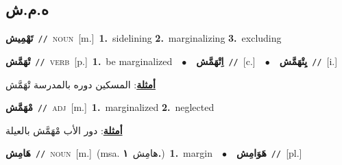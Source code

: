 \documentclass[10pt,a4paper,twoside]{article} %
\begin{document}
\begin{multicols}{2}
\vspace{-3mm}
\subsection*{\color{blue}\foreignlanguage{arabic}{ه.م.ش}\color{blue}{}} 

{\setlength\topsep{0pt}\textbf{\foreignlanguage{arabic}{تَهْمِيش}}\ {\color{gray}\texttt{//}\color{black}}\ \textsc{noun}\ [m.]\ \textbf{1.}~sidelining  \textbf{2.}~marginalizing  \textbf{3.}~excluding\ } \vspace{2mm}

{\setlength\topsep{0pt}\textbf{\foreignlanguage{arabic}{تْهَمَّش}}\ {\color{gray}\texttt{//}\color{black}}\ \textsc{verb}\ [p.]\ \textbf{1.}~be marginalized\ \ $\bullet$\ \ \setlength\topsep{0pt}\textbf{\foreignlanguage{arabic}{اِتْهَمَّش}}\ {\color{gray}\texttt{//}\color{black}}\ [c.]\ \ $\bullet$\ \ \setlength\topsep{0pt}\textbf{\foreignlanguage{arabic}{يِتْهَمَّش}}\ {\color{gray}\texttt{//}\color{black}}\ [i.]\  \begin{flushright}\color{gray}\foreignlanguage{arabic}{\textbf{\underline{\foreignlanguage{arabic}{أمثلة}}}: المسكين دوره بالمدرسة تْهَمَّش}\end{flushright}\color{black}} \vspace{2mm}

{\setlength\topsep{0pt}\textbf{\foreignlanguage{arabic}{مْهَمَّش}}\ {\color{gray}\texttt{//}\color{black}}\ \textsc{adj}\ [m.]\ \textbf{1.}~marginalized  \textbf{2.}~neglected\  \begin{flushright}\color{gray}\foreignlanguage{arabic}{\textbf{\underline{\foreignlanguage{arabic}{أمثلة}}}: دور الأب مْهَمَّش بالعيلة}\end{flushright}\color{black}} \vspace{2mm}

{\setlength\topsep{0pt}\textbf{\foreignlanguage{arabic}{هَامِش}}\ {\color{gray}\texttt{//}\color{black}}\ \textsc{noun}\ [m.]\ \color{gray}(msa. \foreignlanguage{arabic}{هامِش}~\foreignlanguage{arabic}{\textbf{١.}})\color{black}\ \textbf{1.}~margin\ \ $\bullet$\ \ \setlength\topsep{0pt}\textbf{\foreignlanguage{arabic}{هَوَامِش}}\ {\color{gray}\texttt{//}\color{black}}\ [pl.]\ } \vspace{2mm}


\end{multicols}
\end{document}
